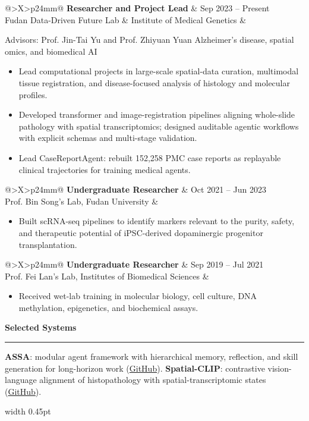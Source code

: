 \documentclass[10pt,a4paper]{article}
\makeatletter
\newcommand{\sectiontitle}[1]{%
  \vspace{0.55em}%
  {\fontsize{10.7}{11.5}\selectfont\bfseries\color{Navy}#1}\par
  \vspace{-0.22em}\color{Rule}\rule{\linewidth}{0.45pt}\color{Ink}\vspace{0.27em}
}
\newcommand{\smallmeta}[1]{{\fontsize{7.8}{9.1}\selectfont\color{Muted}#1}}
\newcommand{\bodytext}[1]{{\fontsize{8.35}{9.8}\selectfont\RaggedRight #1}}
\newcommand{\role}[3]{%
  \begin{tabularx}{\linewidth}{@{}>{\RaggedRight\arraybackslash}X>{\RaggedLeft\arraybackslash}p{24mm}@{}}
    {\fontsize{8.65}{9.9}\selectfont\bfseries\color{Ink}#1} & {\fontsize{7.8}{9}\selectfont\color{Muted}#3}\\[-0.08em]
    {\fontsize{8.05}{9.2}\selectfont\color{Teal}#2} &
  \end{tabularx}\vspace{0.03em}
}
\newenvironment{compactitems}{%
  \begin{itemize}[leftmargin=1.05em,itemsep=0.09em,topsep=0.08em,parsep=0pt,partopsep=0pt,label=\textcolor{Teal}{\raisebox{0.18ex}{\tiny\textbullet}}]
  \fontsize{8.05}{9.45}\selectfont\RaggedRight
}{\end{itemize}}
\makeatother
\begin{document}
\begin{minipage}[t]{0.665\textwidth}
\role{Researcher and Project Lead}{Fudan Data-Driven Future Lab \& Institute of Medical Genetics}{Sep 2023 -- Present}
\smallmeta{Advisors: Prof. Jin-Tai Yu and Prof. Zhiyuan Yuan \textbar{} Alzheimer's disease, spatial omics, and biomedical AI}
\begin{compactitems}
  \item Lead computational projects in large-scale spatial-data curation, multimodal tissue registration, and disease-focused analysis of histology and molecular profiles.
  \item Developed transformer and image-registration pipelines aligning whole-slide pathology with spatial transcriptomics; designed auditable agentic workflows with explicit schemas and multi-stage validation.
  \item Lead CaseReportAgent: rebuilt 152,258 PMC case reports as replayable clinical trajectories for training medical agents.
\end{compactitems}

\vspace{0.16em}
\role{Undergraduate Researcher}{Prof. Bin Song's Lab, Fudan University}{Oct 2021 -- Jun 2023}
\begin{compactitems}
  \item Built scRNA-seq pipelines to identify markers relevant to the purity, safety, and therapeutic potential of iPSC-derived dopaminergic progenitor transplantation.
\end{compactitems}

\vspace{0.12em}
\role{Undergraduate Researcher}{Prof. Fei Lan's Lab, Institutes of Biomedical Sciences}{Sep 2019 -- Jul 2021}
\begin{compactitems}
  \item Received wet-lab training in molecular biology, cell culture, DNA methylation, epigenetics, and biochemical assays.
\end{compactitems}

\sectiontitle{Selected Systems}
\bodytext{\textbf{ASSA}: modular agent framework with hierarchical memory, reflection, and skill generation for long-horizon work (\href{https://github.com/Biogod2020/ASSA}{GitHub}). \quad \textbf{Spatial-CLIP}: contrastive vision-language alignment of histopathology with spatial-transcriptomic states (\href{https://github.com/Biogod2020/Spatial-Clip}{GitHub}).}

\end{minipage}
\hfill
\color{Rule}\vrule width 0.45pt\color{Ink}
\hfill
\end{document}
